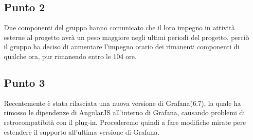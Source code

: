     \subsection{Punto 2}
    Due componenti del gruppo hanno comunicato che il loro impegno in attività esterne al progetto avrà un peso maggiore negli ultimi periodi del progetto, perciò il gruppo ha deciso di aumentare l'impegno orario dei rimanenti componenti di qualche ora, pur rimanendo entro le 104 ore.
    \subsection{Punto 3}
    Recentemente è stata rilasciata una nuova versione di Grafana\glosp (6.7), la quale ha rimosso le dipendenze di AngularJS all'interno di Grafana\glo, causando problemi di retrocompatibità con il plug-in. Procederemo quindi a fare modifiche mirate pere estendere il supporto all'ultima versione di Grafana\glo.
